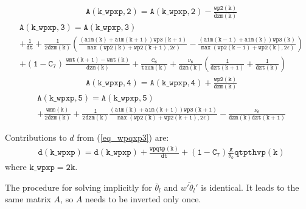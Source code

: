 \documentclass[11pt,fleqn]{article}
\begin{document}
%
\begin{equation}
\begin{split}
&  \mathtt{ A(k\_wpxp,2) = A(k\_wpxp,2) -\frac{wp2(k)}{dzm(k)} }
\end{split}
\end{equation}
%
\begin{equation}
\begin{split}
&  \mathtt{ A(k\_wpxp,3) = A(k\_wpxp,3) } \\
&  \mathtt{
+ \frac{1}{dt}
+ \frac{1}{2 dzm(k)}
  \left( 
   \frac{\left(a1m(k)+a1m(k+1)\right) wp3(k+1)}
       {\max\left(wp2(k)+wp2(k+1),2\epsilon\right)}
  -\frac{\left(a1m(k-1)+a1m(k)\right) wp3(k)}
       {\max\left(wp2(k-1)+wp2(k),2\epsilon\right)}
  \right)
   } \\
&  \mathtt{
+ (1-C_7) \, \frac{wmt(k+1)-wmt(k)}{dzm(k)}
+ \frac{C_6}{taum(k)}
+\frac{\nu_6}{dzm(k)} \left( \frac{1}{dzt(k+1)} + \frac{1}{dzt(k)} \right)
   }
\end{split}
\end{equation}
%
\begin{equation}
\begin{split}
&  \mathtt{ A(k\_wpxp,4) = A(k\_wpxp,4) +\frac{wp2(k)}{dzm(k)} }
\end{split}
\end{equation}
%
\begin{equation}
\begin{split}
&  \mathtt{ A(k\_wpxp,5) = A(k\_wpxp,5) } \\
&  \mathtt{
+ \frac{wmm(k)}{2 dzm(k)}
+ \frac{1}{2 dzm(k)}
  \frac{\left(a1m(k)+a1m(k+1)\right) wp3(k+1)}
       {\max\left(wp2(k)+wp2(k+1),2\epsilon\right)}
-\frac{\nu_6}{dzm(k)dzt(k+1)}
  }
\end{split}
\end{equation}

Contributions to $d$ from (\ref{eq_wpqxp3}) are:
%
\begin{equation}
\begin{split}
& \mathtt{
  d(k\_wpxp) 
= d(k\_wpxp) 
+ \frac{wpqtp(k)}{dt} 
+ (1-C_7) \frac{g}{\theta_0} qtpthvp(k) }
\end{split}
\end{equation}
%
where $\mathtt{k\_wpxp = 2 k}$.





The procedure for solving implicitly for $\bar{\theta}_l$ 
and $\overline{w'\theta_l'}$ is identical. It leads to the same matrix
$A$, so $A$ needs to be inverted only once.
\end{document}
